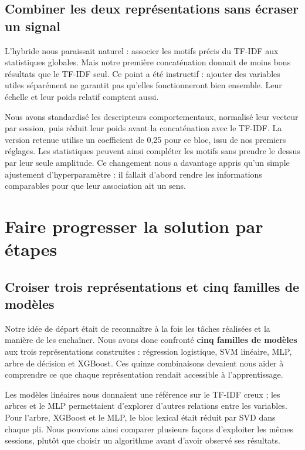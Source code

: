 \documentclass{rapportECL}
\begin{document}
\subsection{Combiner les deux représentations sans écraser un signal}

L'hybride nous paraissait naturel : associer les motifs précis du TF-IDF aux statistiques globales. Mais notre première concaténation donnait de moins bons résultats que le TF-IDF seul. Ce point a été instructif : ajouter des variables utiles séparément ne garantit pas qu'elles fonctionneront bien ensemble. Leur échelle et leur poids relatif comptent aussi.

Nous avons standardisé les descripteurs comportementaux, normalisé leur vecteur par session, puis réduit leur poids avant la concaténation avec le TF-IDF. La version retenue utilise un coefficient de 0,25 pour ce bloc, issu de nos premiers réglages. Les statistiques peuvent ainsi compléter les motifs sans prendre le dessus par leur seule amplitude. Ce changement nous a davantage appris qu'un simple ajustement d'hyperparamètre : il fallait d'abord rendre les informations comparables pour que leur association ait un sens.

\section{Faire progresser la solution par étapes}
\subsection{Croiser trois représentations et cinq familles de modèles}

Notre idée de départ était de reconnaître à la fois les tâches réalisées et la manière de les enchaîner. Nous avons donc confronté \textbf{cinq familles de modèles} aux trois représentations construites : régression logistique, SVM linéaire, MLP, arbre de décision et XGBoost. Ces quinze combinaisons devaient nous aider à comprendre ce que chaque représentation rendait accessible à l'apprentissage.

Les modèles linéaires nous donnaient une référence sur le TF-IDF creux ; les arbres et le MLP permettaient d'explorer d'autres relations entre les variables. Pour l'arbre, XGBoost et le MLP, le bloc lexical était réduit par SVD dans chaque pli. Nous pouvions ainsi comparer plusieurs façons d'exploiter les mêmes sessions, plutôt que choisir un algorithme avant d'avoir observé ses résultats.
\end{document}
